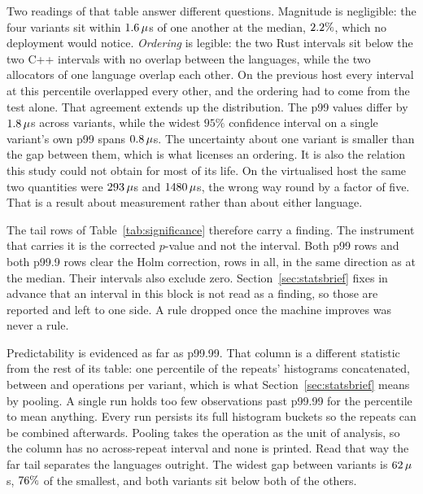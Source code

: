 \documentclass[english,oneside,a4paper,censored,csm,software-track-2020]{HYthesisML}
\begin{document}
Two readings of that table answer different questions. Magnitude is negligible: the four variants
sit within $1.6\,\mu$s of one another at the median, $2.2\%$, which no
deployment would notice. \emph{Ordering} is legible: the two Rust intervals sit below the two C++
intervals with no overlap between the languages, while the two allocators of one language overlap
each other. On the previous host every interval at this percentile overlapped every other, and the
ordering had to come from the test alone. That agreement extends up the distribution. The p99
values differ by $1.8\,\mu$s across variants, while the widest $95\%$ confidence
interval on a single variant's own p99 spans $0.8\,\mu$s. The uncertainty about one
variant is smaller than the gap between them, which is what licenses an ordering. It is also the
relation this study could not obtain for most of its life. On the virtualised host the same two
quantities were $293\,\mu$s and $1480\,\mu$s, the wrong way round
by a factor of five. That is a result about measurement rather than about either language.

The tail rows of Table~\ref{tab:significance} therefore carry a finding. The instrument that
carries it is the corrected $p$-value and not the interval. Both p99 rows and both p99.9 rows
clear the Holm correction, \NTailSignificant{} rows in all, in the same direction as at the median.
Their intervals also exclude zero. Section~\ref{sec:statsbrief} fixes in advance that an interval
in this block is not read as a finding, so those are reported and left to one side. A rule dropped
once the machine improves was never a rule.

Predictability is evidenced as far as p99.99. That column is a different statistic from the
rest of its table: one percentile of the \NRepeats{} repeats' histograms concatenated, between
\FarTailSamplesMin{} and \FarTailSamplesMax{} operations per variant, which is what
Section~\ref{sec:statsbrief} means by pooling. A single run holds too few observations past p99.99
for the percentile to mean anything. Every run persists its full histogram buckets so the repeats
can be combined afterwards. Pooling takes the operation as the unit of analysis, so the column
has no across-repeat interval and none is printed. Read that way the far tail separates the
languages outright. The widest gap between variants is $62\,\mu$s,
$76\%$ of the smallest, and both \FarTailLower{} variants sit below both of the
others.
\end{document}
